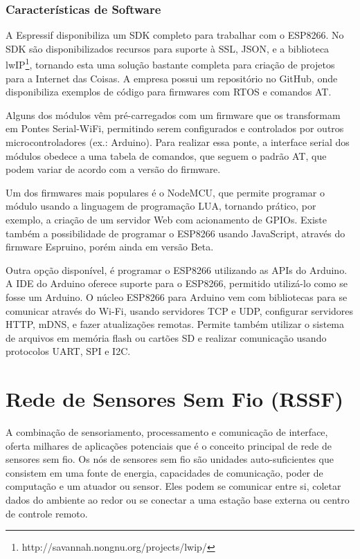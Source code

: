 \subsubsection{Características de Software}

A Espressif disponibiliza um SDK completo para trabalhar com o ESP8266\cite{esp8266:sdk}.
No SDK são disponibilizados recursos para suporte à SSL, JSON, e a
biblioteca lwIP\footnote{http://savannah.nongnu.org/projects/lwip/},
tornando esta uma solução bastante completa para criação de projetos
para a Internet das Coisas. A empresa possui um repositório no GitHub\cite{esp8266:source},
onde disponibiliza exemplos de código para firmwares com RTOS e comandos
AT. 

Alguns dos módulos vêm pré-carregados com um firmware que os transformam
em \textquotedbl{}Pontes Serial-WiFi\textquotedbl{}, permitindo serem
configurados e controlados por outros microcontroladores (ex.: Arduino).
Para realizar essa ponte, a interface serial dos módulos obedece a
uma tabela de comandos, que seguem o padrão AT, que podem variar de
acordo com a versão do firmware. 

Um dos firmwares mais populares é o NodeMCU\cite{esp8266:nodemcu},
que permite programar o módulo usando a linguagem de programação LUA,
tornando prático, por exemplo, a criação de um servidor Web com acionamento
de GPIOs. Existe também a possibilidade de programar o ESP8266 usando
JavaScript, através do firmware Espruino\cite{esp8266:espruino},
porém ainda em versão Beta.

Outra opção disponível, é programar o ESP8266 utilizando as APIs do
Arduino. A IDE do Arduino oferece suporte para o ESP8266, permitido
utilizá-lo como se fosse um Arduino. O núcleo ESP8266 para Arduino\cite{esp8266:arduino}
vem com bibliotecas para se comunicar através do Wi-Fi, usando servidores
TCP e UDP, configurar servidores HTTP, mDNS, e fazer atualizações
remotas. Permite também utilizar o sistema de arquivos em memória
flash ou cartões SD e realizar comunicação usando protocolos UART,
SPI e I2C.

\section{Rede de Sensores Sem Fio (RSSF)}

A combinação de sensoriamento, processamento e comunicação de interface,
oferta milhares de aplicações potenciais que é o conceito principal
de rede de sensores sem fio\cite{hill2003}. Os nós de sensores sem
fio são unidades auto-suficientes que consistem em uma fonte de energia,
capacidades de comunicação, poder de computação e um atuador ou sensor.
Eles podem se comunicar entre si, coletar dados do ambiente ao redor
ou se conectar a uma estação base externa ou centro de controle remoto\cite{olafsen2007}. 

